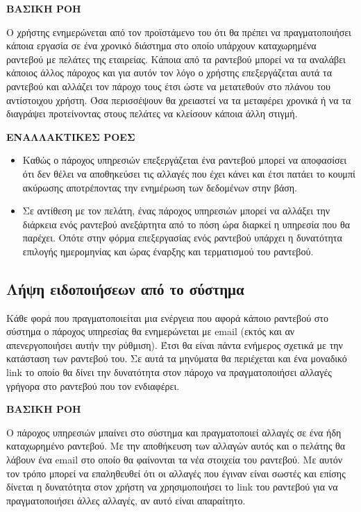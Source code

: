 \textbf{ΒΑΣΙΚΗ ΡΟΗ}

Ο χρήστης ενημερώνεται από τον προϊστάμενο του ότι θα πρέπει να πραγματοποιήσει κάποια εργασία σε ένα χρονικό διάστημα στο οποίο υπάρχουν καταχωρημένα ραντεβού με πελάτες της εταιρείας. Κάποια από τα ραντεβού μπορεί να τα αναλάβει κάποιος άλλος πάροχος και για αυτόν τον λόγο ο χρήστης επεξεργάζεται αυτά τα ραντεβού και αλλάζει τον πάροχο τους έτσι ώστε να μετατεθούν στο πλάνου του αντίστοιχου χρήστη. Όσα περισσέψουν θα χρειαστεί να τα μεταφέρει χρονικά ή να τα διαγράψει προτείνοντας στους πελάτες να κλείσουν κάποια άλλη στιγμή.

\textbf{ΕΝΑΛΛΑΚΤΙΚΕΣ ΡΟΕΣ}

\begin{itemize}
\item Καθώς ο πάροχος υπηρεσιών επεξεργάζεται ένα ραντεβού μπορεί να αποφασίσει ότι δεν θέλει να αποθηκεύσει τις αλλαγές που έχει κάνει και έτσι πατάει το κουμπί ακύρωσης αποτρέποντας την ενημέρωση των δεδομένων στην βάση.
\item Σε αντίθεση με τον πελάτη, ένας πάροχος υπηρεσιών μπορεί να αλλάξει την διάρκεια ενός ραντεβού ανεξάρτητα από το πόση ώρα διαρκεί η υπηρεσία που θα παρέχει. Οπότε στην φόρμα επεξεργασίας ενός ραντεβού υπάρχει η δυνατότητα επιλογής ημερομηνίας και ώρας έναρξης και τερματισμού του ραντεβού.
\end{itemize}

\subsection{Λήψη ειδοποιήσεων από το σύστημα}
Κάθε φορά που πραγματοποιείται μια ενέργεια που αφορά κάποιο ραντεβού στο σύστημα ο πάροχος υπηρεσίας θα ενημερώνεται με email (εκτός και αν απενεργοποιήσει αυτήν την ρύθμιση). Έτσι θα είναι πάντα ενήμερος σχετικά με την κατάσταση των ραντεβού του. Σε αυτά τα μηνύματα θα περιέχεται και ένα μοναδικό link το οποίο θα δίνει την δυνατότητα στον πάροχο να πραγματοποιήσει αλλαγές γρήγορα στο ραντεβού που τον ενδιαφέρει.

\textbf{ΒΑΣΙΚΗ ΡΟΗ}

Ο πάροχος υπηρεσιών μπαίνει στο σύστημα και πραγματοποιεί αλλαγές σε ένα ήδη καταχωρημένο ραντεβού. Με την αποθήκευση των αλλαγών αυτός και ο πελάτης θα λάβουν ένα email στο οποίο θα φαίνονται τα νέα στοιχεία του ραντεβού. Με αυτόν τον τρόπο μπορεί να επαληθευθεί ότι οι αλλαγές που έγιναν είναι σωστές και επίσης δίνεται η δυνατότητα στον χρήστη να χρησιμοποιήσει το link του ραντεβού για να πραγματοποιήσει άλλες αλλαγές, αν αυτό είναι απαραίτητο.


